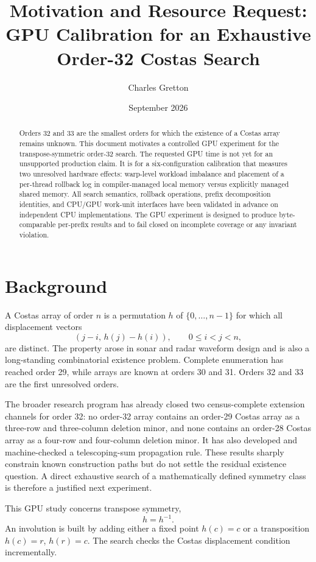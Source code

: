 \documentclass[11pt,a4paper]{article}
\title{Motivation and Resource Request:\\GPU Calibration for an Exhaustive Order-32 Costas Search}
\author{Charles Gretton}
\date{September 2026}
\begin{document}
\maketitle

\begin{abstract}
Orders 32 and 33 are the smallest orders for which the existence of a Costas array remains unknown. This document motivates a controlled GPU experiment for the transpose-symmetric order-32 search. The requested GPU time is not yet for an unsupported production claim. It is for a six-configuration calibration that measures two unresolved hardware effects: warp-level workload imbalance and placement of a per-thread rollback log in compiler-managed local memory versus explicitly managed shared memory. All search semantics, rollback operations, prefix decomposition identities, and CPU/GPU work-unit interfaces have been validated in advance on independent CPU implementations. The GPU experiment is designed to produce byte-comparable per-prefix results and to fail closed on incomplete coverage or any invariant violation.
\end{abstract}

\section{Background}

A Costas array of order $n$ is a permutation $h$ of $\{0,\ldots,n-1\}$ for which all displacement vectors
\[
  (j-i,\,h(j)-h(i)),\qquad 0\le i<j<n,
\]
are distinct. The property arose in sonar and radar waveform design and is also a long-standing combinatorial existence problem. Complete enumeration has reached order 29, while arrays are known at orders 30 and 31. Orders 32 and 33 are the first unresolved orders.

The broader research program has already closed two census-complete extension channels for order 32: no order-32 array contains an order-29 Costas array as a three-row and three-column deletion minor, and none contains an order-28 Costas array as a four-row and four-column deletion minor. It has also developed and machine-checked a telescoping-sum propagation rule. These results sharply constrain known construction paths but do not settle the residual existence question. A direct exhaustive search of a mathematically defined symmetry class is therefore a justified next experiment.

This GPU study concerns transpose symmetry,
\[
 h=h^{-1}.
\]
An involution is built by adding either a fixed point $h(c)=c$ or a transposition $h(c)=r$, $h(r)=c$. The search checks the Costas displacement condition incrementally.
\end{document}
